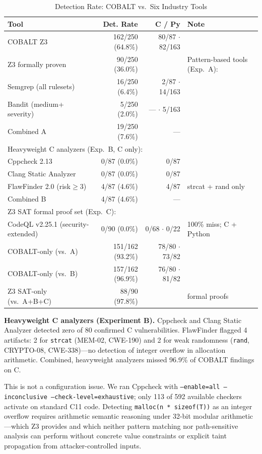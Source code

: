 \documentclass[10pt,twocolumn]{article}
\begin{document}
\begin{table}[t]
\centering
\caption{Detection Rate: COBALT vs.\ Six Industry Tools}
\label{tab:tools}
\begin{tabular}{lrrl}
\toprule
\textbf{Tool} & \textbf{Det. Rate} & \textbf{C / Py} & \textbf{Note} \\
\midrule
COBALT Z3 & 162/250 (64.8\%) & 80/87 $\cdot$ 82/163 & \\
\quad Z3 formally proven & 90/250 (36.0\%) & & Pattern-based tools (Exp.\ A): \\
\midrule
Semgrep (all rulesets) & 16/250 (6.4\%) & 2/87 $\cdot$ 14/163 & \\
Bandit (medium+ severity) & 5/250 (2.0\%) & --- $\cdot$ 5/163 & \\
Combined A & 19/250 (7.6\%) & --- & \\
\midrule
\multicolumn{4}{l}{Heavyweight C analyzers (Exp.\ B, C only):} \\
Cppcheck 2.13 & 0/87 (0.0\%) & 0/87 & \\
Clang Static Analyzer & 0/87 (0.0\%) & 0/87 & \\
FlawFinder 2.0 (risk$\geq$3) & 4/87 (4.6\%) & 4/87 & strcat + rand only \\
Combined B & 4/87 (4.6\%) & --- & \\
\midrule
\multicolumn{4}{l}{Z3 SAT formal proof set (Exp.\ C):} \\
CodeQL v2.25.1 (security-extended) & 0/90 (0.0\%) & 0/68 $\cdot$ 0/22 & 100\% miss; C + Python \\
\midrule
COBALT-only (vs.\ A) & 151/162 (93.2\%) & 78/80 $\cdot$ 73/82 & \\
COBALT-only (vs.\ B) & 157/162 (96.9\%) & 76/80 $\cdot$ 81/82 & \\
Z3 SAT-only (vs.\ A+B+C) & 88/90 (97.8\%) & & formal proofs \\
\bottomrule
\end{tabular}
\end{table}

\textbf{Heavyweight C analyzers (Experiment B).} Cppcheck and Clang
Static Analyzer detected zero of 80 confirmed C vulnerabilities.
FlawFinder flagged 4 artifacts: 2 for \texttt{strcat} (MEM-02, CWE-190)
and 2 for weak randomness (\texttt{rand}, CRYPTO-08, CWE-338)---no
detection of integer overflow in allocation arithmetic. Combined,
heavyweight analyzers missed 96.9\% of COBALT findings on C.

This is not a configuration issue. We ran Cppcheck with
\texttt{--enable=all --inconclusive --check-level=exhaustive}; only 113
of 592 available checkers activate on standard C11 code. Detecting
\texttt{malloc(n * sizeof(T))} as an integer overflow requires
arithmetic semantic reasoning under 32-bit modular
arithmetic---which Z3 provides and which neither pattern matching nor
path-sensitive analysis can perform without concrete value constraints or
explicit taint propagation from attacker-controlled inputs.
\end{document}
